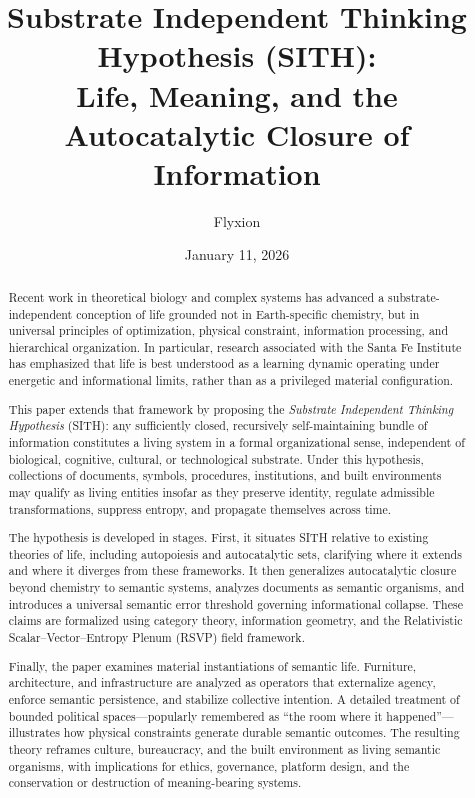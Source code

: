 \documentclass[11pt,oneside]{article}
\title{Substrate Independent Thinking Hypothesis (SITH):\\
Life, Meaning, and the Autocatalytic Closure of Information}
\author{Flyxion}
\date{January 11, 2026}
\begin{document}
\maketitle

\begin{abstract}
Recent work in theoretical biology and complex systems has advanced a substrate-independent conception of life grounded not in Earth-specific chemistry, but in universal principles of optimization, physical constraint, information processing, and hierarchical organization. In particular, research associated with the Santa Fe Institute has emphasized that life is best understood as a learning dynamic operating under energetic and informational limits, rather than as a privileged material configuration.

This paper extends that framework by proposing the \emph{Substrate Independent Thinking Hypothesis} (SITH): any sufficiently closed, recursively self-maintaining bundle of information constitutes a living system in a formal organizational sense, independent of biological, cognitive, cultural, or technological substrate. Under this hypothesis, collections of documents, symbols, procedures, institutions, and built environments may qualify as living entities insofar as they preserve identity, regulate admissible transformations, suppress entropy, and propagate themselves across time.

The hypothesis is developed in stages. First, it situates SITH relative to existing theories of life, including autopoiesis and autocatalytic sets, clarifying where it extends and where it diverges from these frameworks. It then generalizes autocatalytic closure beyond chemistry to semantic systems, analyzes documents as semantic organisms, and introduces a universal semantic error threshold governing informational collapse. These claims are formalized using category theory, information geometry, and the Relativistic Scalar–Vector–Entropy Plenum (RSVP) field framework.

Finally, the paper examines material instantiations of semantic life. Furniture, architecture, and infrastructure are analyzed as operators that externalize agency, enforce semantic persistence, and stabilize collective intention. A detailed treatment of bounded political spaces—popularly remembered as “the room where it happened”—illustrates how physical constraints generate durable semantic outcomes. The resulting theory reframes culture, bureaucracy, and the built environment as living semantic organisms, with implications for ethics, governance, platform design, and the conservation or destruction of meaning-bearing systems.
\end{abstract}
\end{document}
